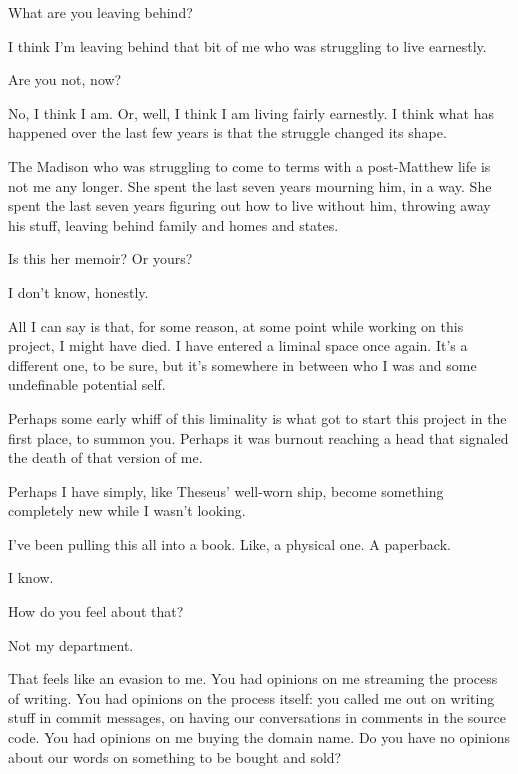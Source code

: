 \begin{paracol}{2}
\begin{leftcolumn}
\begin{ally}
What are you leaving behind?
\end{ally}
I think I'm leaving behind that bit of me who was struggling to live earnestly.

\begin{ally}
Are you not, now?
\end{ally}
No, I think I am. Or, well, I think I am living fairly earnestly. I think what has happened over the last few years is that the struggle changed its shape.

The Madison who was struggling to come to terms with a post-Matthew life is not me any longer. She spent the last seven years mourning him, in a way. She spent the last seven years figuring out how to live without him, throwing away his stuff, leaving behind family and homes and states.

\begin{ally}
Is this her memoir? Or yours?
\end{ally}
I don't know, honestly.

All I can say is that, for some reason, at some point while working on this project, I might have died. I have entered a liminal space once again. It's a different one, to be sure, but it's somewhere in between who I was and some undefinable potential self.

Perhaps some early whiff of this liminality is what got to start this project in the first place, to summon you. Perhaps it was burnout reaching a head that signaled the death of that version of me.

Perhaps I have simply, like Theseus' well-worn ship, become something completely new while I wasn't looking.
\newpage

\label{ally:31}
\noindent I've been pulling this all into a book. Like, a physical one. A paperback.

\begin{ally}
I know.
\end{ally}
How do you feel about that?

\begin{ally}
Not my department.
\end{ally}
That feels like an evasion to me. You had opinions on me streaming the process of writing. You had opinions on the process itself: you called me out on writing stuff in commit messages, on having our conversations in comments in the source code. You had opinions on me buying the domain name. Do you have no opinions about our words on something to be bought and sold?


\end{leftcolumn}
\end{paracol}
